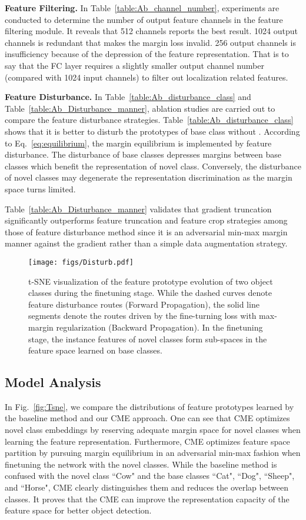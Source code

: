 \documentclass[final]{cvpr}
\begin{document}
\textbf{Feature Filtering.}  In Table~\ref{table:Ab_channel_number}, experiments are conducted to determine the number of output feature channels in the feature filtering module. It reveals that 512 channels reports the best result. 1024 output channels is redundant that makes the margin loss invalid. 256 output channels is insufficiency because of the depression of the feature representation. That is to say that the FC layer requires a slightly smaller output channel number (compared with 1024 input channels) to filter out localization related features.

\textbf{Feature Disturbance.} In Table~\ref{table:Ab_disturbance_class} and Table\ \ref{table:Ab_Disturbance_manner}, ablation studies are carried out to compare the feature disturbance strategies. Table~\ref{table:Ab_disturbance_class} shows that it is better to disturb the prototypes of base class  without . According to Eq.\ \ref{eq:equilibrium}, the margin equilibrium is implemented by feature disturbance. The disturbance of base classes depresses margins between base classes which benefit the representation of novel class. Conversely, the disturbance of novel classes may degenerate the representation discrimination as the margin space turns limited. 

Table\ \ref{table:Ab_Disturbance_manner} validates that gradient truncation significantly outperforms feature truncation and feature crop strategies among those of feature disturbance method since it is an adversarial min-max margin manner against the gradient rather than a simple data augmentation strategy.

\begin{figure}[t]
\centering
\texttt{[image: figs/Disturb.pdf]}
\caption{t-SNE visualization of the feature prototype evolution of two object classes during the finetuning stage. While the dashed curves denote feature disturbance routes (Forward Propagation), the solid line segments denote the routes driven by the fine-turning loss with max-margin regularization (Backward Propagation). In the finetuning stage, the instance features of novel classes form sub-spaces in the feature space learned on base classes.}
\label{fig:Disturbance}
\end{figure}

\subsection{Model Analysis}
In Fig.\ \ref{fig:Tsne}, we compare the distributions of feature prototypes learned by the baseline method and our CME approach. One can see that CME optimizes novel class embeddings by reserving adequate margin space for novel classes when learning the feature representation. Furthermore, CME optimizes feature space partition by pursuing margin equilibrium in an adversarial min-max fashion when finetuning the network with the novel classes. While the baseline method is confused with the novel class ``Cow" and the base classes ``Cat", ``Dog", ``Sheep", and ``Horse", CME clearly distinguishes them and reduces the overlap between classes. It proves that the CME can improve the representation capacity of the feature space for better object detection. 
\end{document}
